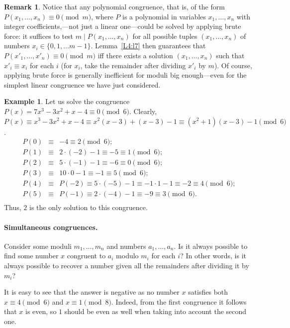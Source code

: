 \documentclass[12pt,notitlepage]{article}
\theoremstyle{plain}
\theoremstyle{definition}
\newtheorem{exm}[thm]{Example}
\newtheorem{rem}[thm]{Remark}
\theoremstyle{plain}
\newcommand{\1}{\mathbf{1}}
\newcommand{\0}{\mathbf{0}}
\newcommand{\dvd}{\mathop{\mid}}
\begin{document}
\begin{rem}
Notice that any polynomial congruence, that is, of the form $P(x_1,\ldots,x_n) \equiv 0 \pmod m$, where $P$ is a polynomial in variables $x_1,\ldots,x_n$ with integer coefficients,---not just a linear one---could be solved by applying brute force: it suffices to test $m \dvd P(x_1,\ldots,x_n)$ for all possible tuples $(x_1,\ldots,x_n)$ of numbers $x_i \in \{0, 1,\ldots m - 1\}$. Lemma~\ref{L4:l7} then guarantees that $P(x'_1,\ldots,x'_n) \equiv 0 \pmod m$ iff there exists a solution $(x_1,\ldots,x_n)$ such that $x'_i \equiv x_i$ for each $i$ (for $x_i$, take the remainder after dividing $x'_i$ by $m$). Of course, applying brute force is generally inefficient for moduli big enough---even for the simplest linear congruence we have just considered.
\end{rem}

\begin{exm}
Let us solve the congruence $P(x) = 7x^3 - 3x^2 + x - 4 \equiv 0 \pmod 6$. Clearly, $P(x) \equiv x^3 - 3x^2 + x - 4 \equiv x^2(x - 3) + (x - 3) - 1 \equiv (x^2 + 1)(x-3) - 1 \pmod 6$.
$$
\begin{array}{rcl}
P(0) &\equiv& -4 \equiv 2 \pmod 6;\\
P(1) &\equiv& 2\cdot(-2) - 1 \equiv -5 \equiv 1 \pmod 6;\\
P(2) &\equiv& 5\cdot(-1) - 1 \equiv -6 \equiv 0 \pmod 6;\\
P(3) &\equiv& 10\cdot 0 - 1 \equiv -1 \equiv 5 \pmod 6;\\
P(4) &\equiv& P(-2) \equiv 5\cdot (-5) - 1 \equiv -1 \cdot 1 - 1 \equiv -2 \equiv 4 \pmod 6;\\
P(5) &\equiv& P(-1) \equiv 2\cdot (-4) - 1 \equiv -9 \equiv 3 \pmod 6.\\
\end{array}
$$
Thus, $2$ is the only solution to this congruence.
\end{exm}

\paragraph{Simultaneous congruences.} Consider some moduli $m_1, \ldots, m_n$ and numbers $a_1, \ldots, a_n$. Is it always possible to find some number $x$ congruent to $a_i$ modulo $m_i$ for each $i$? In other words, is it always possible to recover a number given all the remainders after dividing it by $m_i$?

It is easy to see that the answer is negative as no number $x$ satisfies both $x \equiv 4 \pmod {6}$ and  $x \equiv 1 \pmod {8}$. Indeed, from the first congruence it follows that $x$ is even, so $1$ should be even as well when taking into account the second one.
\end{document}
